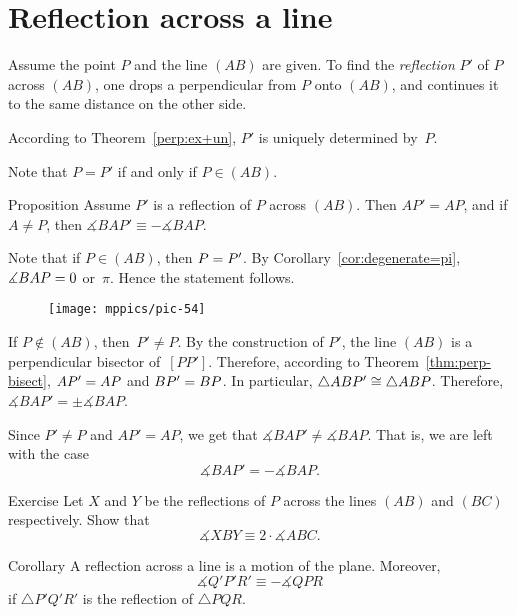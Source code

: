\section{Reflection across a line}

Assume the point $P$ and the line $(AB)$ are given.
To find the \emph{reflection} $P'$ of $P$ across $(AB)$,
one drops a perpendicular from $P$ onto $(AB)$, 
and continues it to the same distance on the other side.

According to Theorem~\ref{perp:ex+un}, $P'$ is uniquely determined by~$P$.

Note that $P=P'$ if and only if $P\in(AB)$.

\begin{thm}[\abs]{Proposition}\label{prop:reflection}
Assume $P'$ is a reflection of $P$ across $(AB)$.
Then $AP'=AP$, 
and if $A\ne P$, 
then
$\measuredangle BAP'\equiv -\measuredangle BAP$.
\end{thm}

Note that if $P\in (AB)$, 
then $P=P'$. 
By Corollary~\ref{cor:degenerate=pi}, $\measuredangle BAP=0$ or~$\pi$.
Hence the statement follows.

{

\begin{wrapfigure}{o}{37mm}
\vskip-2mm
\centering
\texttt{[image: mppics/pic-54]}
\end{wrapfigure}

If $P\notin (AB)$, then~$P'\ne P$.
By the construction of $P'$, 
the line $(AB)$ is a perpendicular bisector of~$[PP']$.
Therefore, according to Theorem~\ref{thm:perp-bisect}, $AP'=AP$ and $BP'=BP$.
In particular, 
$\triangle ABP'\cong \triangle ABP$.
Therefore, $\measuredangle BAP'=\pm \measuredangle BAP$.

Since $P'\ne P$ and $AP'=AP$,
we get that $\measuredangle BAP'\ne \measuredangle BAP$.
That is, we are left with the case
$$\measuredangle BAP'=-\measuredangle BAP.$$
\qedsf

}

\begin{thm}{Exercise}\label{ex:2-reflections}
Let $X$ and $Y$ be the reflections of $P$ across the lines $(AB)$ and $(BC)$ respectively.
Show that 
$$\measuredangle XBY\equiv 2\cdot \measuredangle ABC.$$

\end{thm}


\begin{thm}[\abs]{Corollary}\label{cor:reflection+angle}
A reflection across a line is a motion of the plane. 
Moreover,
$$\measuredangle Q'P'R'\equiv -\measuredangle QPR$$
if $\triangle P'Q'R'$ is the reflection of $\triangle PQR$.
\end{thm}


